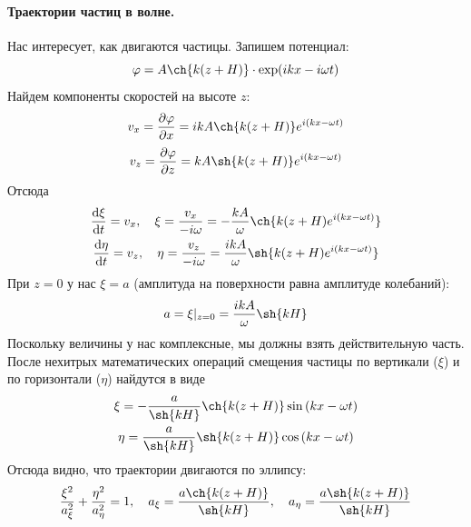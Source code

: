 \paragraph{Траектории частиц в волне. } Нас интересует, как двигаются частицы. Запишем потенциал:
\begin{equation}
	\phi=A\ch{k(z+H)}\cdot\exp(ikx-i\omega t)
\end{equation}
Найдем компоненты скоростей на высоте $z$:
\begin{equation}
    v_x = \pdv{\phi}{x} = ikA\ch{k(z+H)}e^{i(kx-\omega t)}
\end{equation}
\begin{equation}
    v_z = \pdv{\phi}{z} = kA\sh{k(z+H)}e^{i(kx-\omega t)} 
\end{equation}
Отсюда
\begin{gather}
    \dv{\xi}{t} = v_x, \quad \xi=\frac{v_x}{-i\omega} = -\frac{kA}{\omega}\ch{k(z+H) e^{i(kx-\omega t)} }\\
    \dv{\eta}{t} = v_z, \quad \eta=\frac{v_z}{-i\omega} = \frac{ikA}{\omega}\sh{k(z+H) e^{i(kx-\omega t)} } \\
\end{gather}
При $z = 0$ у нас $\xi = a$ (амплитуда на поверхности равна амплитуде колебаний):
\begin{equation}
    a = \xi|_{z = 0} = \frac{ikA}{\omega}\sh{kH}
\end{equation}
Поскольку величины у нас комплексные, мы должны взять действительную часть. После нехитрых математических операций смещения частицы по вертикали ($\xi$) и по горизонтали ($\eta$) найдутся в виде
\begin{gather}
    \xi = -\frac{a}{\sh{kH}}\ch{k(z+H)}\sin{(kx-\omega t)}\\
    \eta = \frac{a}{\sh{kH}}\sh{k(z+H)}\cos{(kx-\omega t)}\\
\end{gather}
Отсюда видно, что траектории двигаются по эллипсу:
\begin{equation}
    \frac{\xi^2}{a_\xi^2}+\frac{\eta^2}{a_\eta^2} = 1, 
    \quad a_\xi = \frac{a\ch{k(z+H)}}{\sh{kH}}
    , \quad a_\eta = \frac{a\sh{k(z+H)}}{\sh{kH}}
\end{equation}


